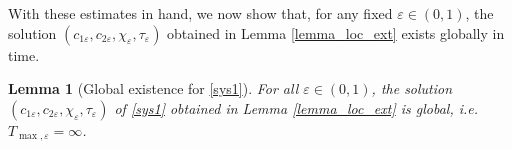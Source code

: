 \documentclass[a4paper,10pt]{article}
\newtheorem{Lemma}[Theorem]{Lemma}
\theoremstyle{definition}
\begin{document}
\noindent
With these estimates in hand, we now show that, for any fixed $\varepsilon \in (0, 1)$, the solution $(c_{1\varepsilon}, c_{2\varepsilon}, \chi_\varepsilon, \tau_\varepsilon)$ obtained in Lemma \ref{lemma_loc_ext} exists globally in time.
\begin{Lemma}[Global existence for \eqref{sys1}]
   For all $\varepsilon \in (0, 1)$, the solution $(c_{1\varepsilon}, c_{2\varepsilon}, \chi_\varepsilon, \tau_\varepsilon)$ of \eqref{sys1} obtained in Lemma \ref{lemma_loc_ext} is global, i.e. $T_{\max, \varepsilon} = \infty$.
\end{Lemma}
\end{document}
